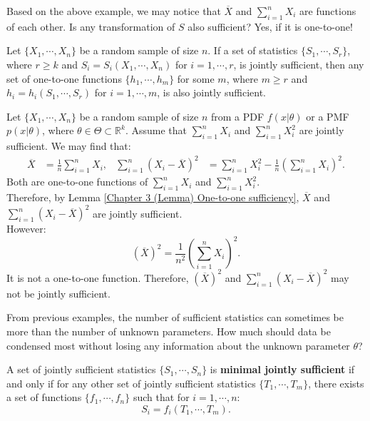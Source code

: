 \documentclass{huhtakm-template-book-v2}
\begin{document}
    Based on the above example, we may notice that $\overline{X}$ and $\sum_{i=1}^{n} X_{i}$ are functions of each other. Is any transformation of $S$ also sufficient? Yes, if it is one-to-one!
    \begin{lem}
        \label{Chapter 3 (Lemma) One-to-one sufficiency}
        Let $\{X_{1}, \cdots, X_{n}\}$ be a random sample of size $n$. If a set of statistics $\{S_{1}, \cdots, S_{r}\}$, where $r \geq k$ and $S_{i} = S_{i}(X_{1}, \cdots, X_{n})$ for $i = 1, \cdots, r$, is jointly sufficient, then any set of one-to-one functions $\{h_{1}, \cdots, h_{m}\}$ for some $m$, where $m \geq r$ and $h_{i} = h_{i}(S_{1}, \cdots, S_{r})$ for $i = 1, \cdots, m$, is also jointly sufficient.
    \end{lem}
    \begin{eg}
        Let $\{X_{1}, \cdots, X_{n}\}$ be a random sample of size $n$ from a PDF $f(x | \theta)$ or a PMF $p(x | \theta)$, where $\theta \in \Theta \subset \mathbb{R}^{k}$. Assume that $\sum_{i=1}^{n} X_{i}$ and $\sum_{i=1}^{n} X_{i}^{2}$ are jointly sufficient. We may find that:
        \begin{align*}
            \overline{X} &= \frac{1}{n} \sum_{i=1}^{n} X_{i}, & \sum_{i=1}^{n} (X_{i} - \overline{X})^{2} &= \sum_{i=1}^{n} X_{i}^{2} - \frac{1}{n}\left(\sum_{i=1}^{n} X_{i}\right)^{2}.
        \end{align*}
        Both are one-to-one functions of $\sum_{i=1}^{n} X_{i}$ and $\sum_{i=1}^{n} X_{i}^{2}$.\\
        Therefore, by Lemma \ref{Chapter 3 (Lemma) One-to-one sufficiency}, $\overline{X}$ and $\sum_{i=1}^{n} (X_{i} - \overline{X})^{2}$ are jointly sufficient.\\
        However:
        \begin{equation*}
            (\overline{X})^{2} = \frac{1}{n^{2}}\left(\sum_{i=1}^{n} X_{i}\right)^{2}.
        \end{equation*}
        It is not a one-to-one function. Therefore, $(\overline{X})^{2}$ and $\sum_{i=1}^{n} (X_{i} - \overline{X})^{2}$ may not be jointly sufficient.
    \end{eg}
    From previous examples, the number of sufficient statistics can sometimes be more than the number of unknown parameters. How much should data be condensed most without losing any information about the unknown parameter $\theta$?
    \begin{defn}
        A set of jointly sufficient statistics $\{S_{1}, \cdots, S_{n}\}$ is \textbf{minimal jointly sufficient} if and only if for any other set of jointly sufficient statistics $\{T_{1}, \cdots, T_{m}\}$, there exists a set of functions $\{f_{1}, \cdots, f_{n}\}$ such that for $i = 1, \cdots, n$:
        \begin{equation*}
            S_{i} = f_{i}(T_{1}, \cdots, T_{m}).
        \end{equation*}
    \end{defn}
\end{document}
